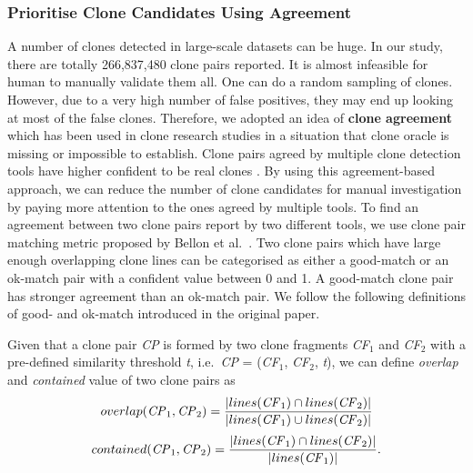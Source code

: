 \documentclass{sig-alternate-05-2015}
\newcommand{\squeezeup}{\vspace{-0.5mm}}
\begin{document}
\subsubsection{Prioritise Clone Candidates Using Agreement}
A number of clones detected in large-scale datasets can be huge. In our study, there are totally 266,837,480 clone pairs reported. It is almost infeasible for human to manually validate them all. One can do a random sampling of clones. However, due to a very high number of false positives, they may end up looking at most of the false clones. Therefore, we adopted an idea of \textbf{clone agreement} which has been used in clone research studies \cite{Wang2013,Funaro2010,cr2016ssbse} in a situation that clone oracle is missing or impossible to establish. Clone pairs agreed by multiple clone detection tools have higher confident to be real clones \cite{cr2016ssbse}. By using this agreement-based approach, we can reduce the number of clone candidates for manual investigation by paying more attention to the ones agreed by multiple tools. To find an agreement between two clone pairs report by two different tools, we use clone pair matching metric proposed by Bellon et al.~\cite{Bellon2007}. Two clone pairs which have large enough overlapping clone lines can be categorised as either a good-match or an ok-match pair with a confident value between 0 and 1. A good-match clone pair has stronger agreement than an ok-match pair. We follow the following definitions of good- and ok-match introduced in the original paper.

\vspace{0.5ex}
Given that a clone pair \textit{CP} is formed by two clone fragments \textit{CF$_1$} and \textit{CF$_2$} with a pre-defined similarity threshold \textit{t}, i.e.~\textit{CP} = (\textit{CF$_1$}, \textit{CF$_2$}, \textit{t}), we can define \textit{overlap} and \textit{contained} value of two clone pairs as 
\begin{multline}
	overlap(\textrm{\textit{CP}}_1, \textrm{\textit{CP}}_2) = \frac{|lines(\textrm{\textit{CF}}_1) \cap lines(\textrm{\textit{CF}}_2)|}{|lines(\textrm{\textit{CF}}_1) \cup lines(\textrm{\textit{CF}}_2)|} 
\end{multline}
\begin{multline}
	contained(\textrm{\textit{CP}}_1, \textrm{\textit{CP}}_2) = \frac{|lines(\textrm{\textit{CF}}_1) \cap lines(\textrm{\textit{CF}}_2)|}{|lines(\textrm{\textit{CF}}_1)|}. 
\end{multline}
\end{document}
